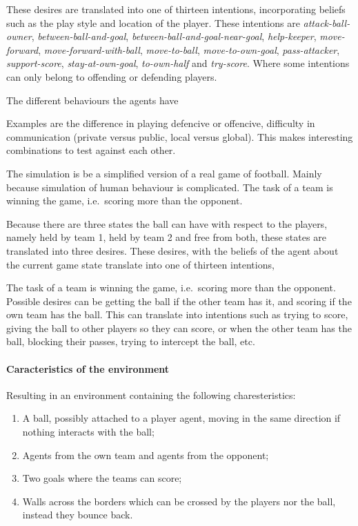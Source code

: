 \documentclass{article}
\begin{document}
These desires are translated into one of thirteen intentions, incorporating beliefs such as the play style and location of the player. These intentions are {\em attack-ball-owner}, {\em between-ball-and-goal}, {\em between-ball-and-goal-near-goal}, {\em help-keeper}, {\em move-forward}, {\em move-forward-with-ball}, {\em move-to-ball}, {\em move-to-own-goal}, {\em pass-attacker}, {\em support-score}, {\em stay-at-own-goal}, {\em to-own-half} and {\em try-score}. Where some intentions can only belong to offending or defending players.


The different behaviours the agents have 

Examples are the difference in playing defencive or offencive, difficulty in communication (private versus public, local versus global). This makes interesting combinations to test against each other.



The simulation is be a simplified version of a real game of football. Mainly because simulation of human behaviour is complicated. The task of a team is winning the game, i.e.~scoring more than the opponent. 


Because there are three states the ball can have with respect to the players, namely held by team 1, held by team 2 and free from both, these states are translated into three desires. These desires, with the beliefs of the agent about the current game state translate into one of thirteen intentions, 

The task of a team is winning the game, i.e.~scoring more than the opponent. Possible desires can be getting the ball if the other team has it, and scoring if the own team has the ball. This can translate into intentions such as trying to score, giving the ball to other players so they can score, or when the other team has the ball, blocking their passes, trying to intercept the ball, etc.



\paragraph{Caracteristics of the environment}

 Resulting in an environment containing the following charesteristics:
\begin{enumerate}
    \item A ball, possibly attached to a player agent, moving in the same direction if nothing interacts with the ball;
    \item Agents from the own team and agents from the opponent;
    \item Two goals where the teams can score;
    \item Walls across the borders which can be crossed by the players nor the ball, instead they bounce back.
\end{enumerate}
\end{document}
